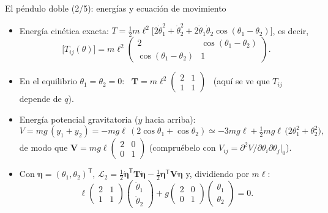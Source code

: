 \documentclass[spanish]{beamer}
\newcommand{\Tm}{\mathbf{T}}              %
\newcommand{\Vm}{\mathbf{V}}              %
\newcommand{\bfeta}{\boldsymbol{\eta}}    %
\begin{document}
\begin{frame}{El péndulo doble (2/5): energías y ecuación de movimiento}
\small
\begin{itemize}
\item<1-> Energía cinética exacta:
$T=\tfrac12m\ell^2\big[2\dot\theta_1^2+\dot\theta_2^2+2\dot\theta_1\dot\theta_2\cos(\theta_1-\theta_2)\big]$, es decir,
\[
\big[T_{ij}(\theta)\big]=m\ell^2\begin{pmatrix}2&\cos(\theta_1-\theta_2)\\ \cos(\theta_1-\theta_2)&1\end{pmatrix}.
\]
\item<2-> En el equilibrio $\theta_1=\theta_2=0$: \ $\Tm=m\ell^2\begin{pmatrix}2&1\\1&1\end{pmatrix}$ \ (aquí se ve que $T_{ij}$ depende de $q$).
\item<3-> Energía potencial gravitatoria ($y$ hacia arriba):
\[
V=mg\,(y_1+y_2)=-mg\ell\,(2\cos\theta_1+\cos\theta_2)\simeq-3mg\ell+\tfrac12mg\ell\,\big(2\theta_1^2+\theta_2^2\big),
\]
de modo que $\Vm=mg\ell\begin{pmatrix}2&0\\0&1\end{pmatrix}$ (compruébelo con $V_{ij}=\partial^2V/\partial\theta_i\partial\theta_j|_0$).
\item<4-> Con $\bfeta=(\theta_1,\theta_2)^{\mathsf T}$, $\mathcal{L}_2=\tfrac12\dot{\bfeta}^{\mathsf T}\Tm\dot{\bfeta}-\tfrac12\bfeta^{\mathsf T}\Vm\bfeta$ y, dividiendo por $m\ell$:
\[
\ell\begin{pmatrix}2&1\\1&1\end{pmatrix}\begin{pmatrix}\ddot\theta_1\\ \ddot\theta_2\end{pmatrix}
+g\begin{pmatrix}2&0\\0&1\end{pmatrix}\begin{pmatrix}\theta_1\\ \theta_2\end{pmatrix}=0 .
\]
\end{itemize}
\end{frame}
\end{document}
